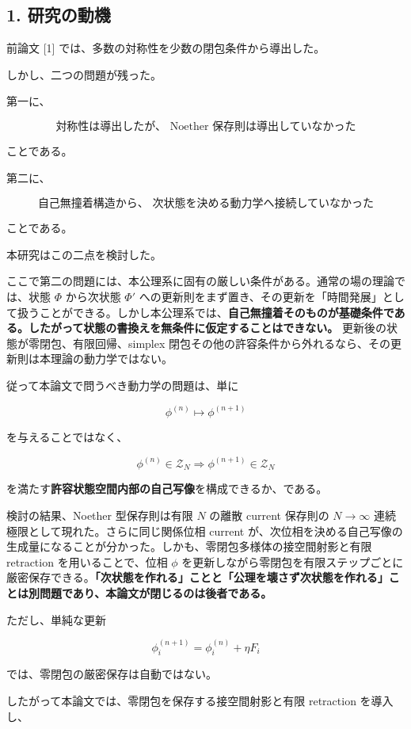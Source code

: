 \documentclass[
  a4paper,
]{ltjsarticle}
\begin{document}
\subsection{1. 研究の動機}\label{ux7814ux7a76ux306eux52d5ux6a5f}

前論文 {[}1{]} では、多数の対称性を少数の閉包条件から導出した。

しかし、二つの問題が残った。

第一に、

\[
\boxed{
\text{対称性は導出したが、
Noether 保存則は導出していなかった}
}
\]

ことである。

第二に、

\[
\boxed{
\text{自己無撞着構造から、
次状態を決める動力学へ接続していなかった}
}
\]

ことである。

本研究はこの二点を検討した。

ここで第二の問題には、本公理系に固有の厳しい条件がある。通常の場の理論では、状態
\(\Phi\) から次状態 \(\Phi'\)
への更新則をまず置き、その更新を「時間発展」として扱うことができる。しかし本公理系では、\textbf{自己無撞着そのものが基礎条件である。したがって状態の書換えを無条件に仮定することはできない。}
更新後の状態が零閉包、有限回帰、simplex
閉包その他の許容条件から外れるなら、その更新則は本理論の動力学ではない。

従って本論文で問うべき動力学の問題は、単に

\[
\phi^{(n)}\mapsto\phi^{(n+1)}
\]

を与えることではなく、

\[
\boxed{
\phi^{(n)}\in\mathcal Z_N
\Longrightarrow
\phi^{(n+1)}\in\mathcal Z_N
}
\]

を満たす\textbf{許容状態空間内部の自己写像}を構成できるか、である。

検討の結果、Noether 型保存則は有限 \(N\) の離散 current 保存則の
\(N\to\infty\) 連続極限として現れた。さらに同じ関係位相 current
が、次位相を決める自己写像の生成量になることが分かった。しかも、零閉包多様体の接空間射影と有限
retraction を用いることで、位相 \(\phi\)
を更新しながら零閉包を有限ステップごとに厳密保存できる。\textbf{「次状態を作れる」ことと「公理を壊さず次状態を作れる」ことは別問題であり、本論文が閉じるのは後者である。}

ただし、単純な更新

\[
\phi_i^{(n+1)}
=
\phi_i^{(n)}
+
\eta F_i
\]

では、零閉包の厳密保存は自動ではない。

したがって本論文では、零閉包を保存する接空間射影と有限 retraction
を導入し、
\end{document}
